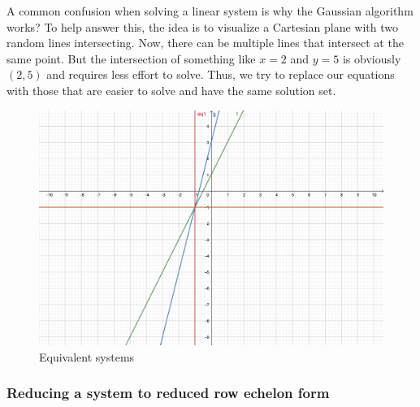 \documentclass[titlepage]{article}
\numberwithin{equation}{subsection}
\begin{document}
A common confusion when solving a linear system is why the Gaussian algorithm works? To help answer this, the idea is to visualize a Cartesian plane with two random lines intersecting. Now, there can be multiple lines that intersect at the same point. But the intersection of something like $x=2$ and $y=5$ is obviously $(2,5)$ and requires less effort to solve. Thus, we try to replace our equations with those that are easier to solve and have the same solution set. 

\begin{figure}[h]
    \centering
    \includegraphics[scale=0.5]{epflLectureNotes/linearAlgebra/figures/linearGauss.png}
    \caption{Equivalent systems}
    \label{fig1}
\end{figure}

\subsubsection{Reducing a system to reduced row echelon form}
\end{document}
